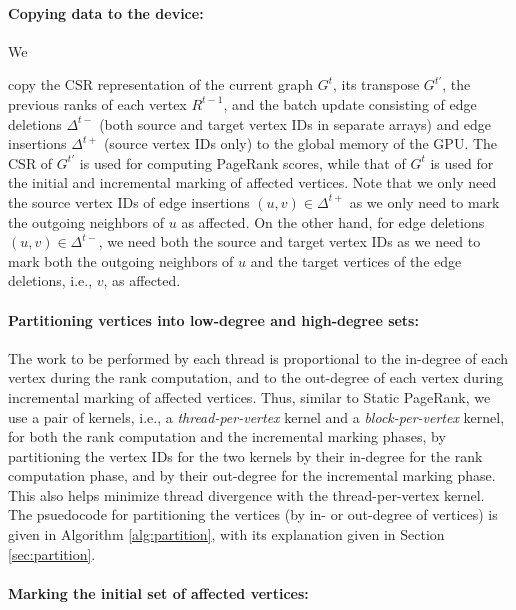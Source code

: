 \paragraph{Copying data to the device:}

We copy the CSR representation of the current graph $G^t$, its transpose $G^{t'}$, the previous ranks of each vertex $R^{t-1}$, and the batch update consisting of edge deletions $\Delta^{t-}$ (both source and target vertex IDs in separate arrays) and edge insertions $\Delta^{t+}$ (source vertex IDs only) to the global memory of the GPU. The CSR of $G^{t'}$ is used for computing PageRank scores, while that of $G^t$ is used for the initial and incremental marking of affected vertices. Note that we only need the source vertex IDs of edge insertions $(u, v) \in \Delta^{t+}$ as we only need to mark the outgoing neighbors of $u$ as affected. On the other hand, for edge deletions $(u, v) \in \Delta^{t-}$, we need both the source and target vertex IDs as we need to mark both the outgoing neighbors of $u$ and the target vertices of the edge deletions, i.e., $v$, as affected.

\paragraph{Partitioning vertices into low-degree and high-degree sets:}

The work to be performed by each thread is proportional to the in-degree of each vertex during the rank computation, and to the out-degree of each vertex during incremental marking of affected vertices. Thus, similar to Static PageRank, we use a pair of kernels, i.e., a \textit{thread-per-vertex} kernel and a \textit{block-per-vertex} kernel, for both the rank computation and the incremental marking phases, by partitioning the vertex IDs for the two kernels by their in-degree for the rank computation phase, and by their out-degree for the incremental marking phase. This also helps minimize thread divergence with the thread-per-vertex kernel. The psuedocode for partitioning the vertices (by in- or out-degree of vertices) is given in Algorithm \ref{alg:partition}, with its explanation given in Section \ref{sec:partition}.

\paragraph{Marking the initial set of affected vertices:}

